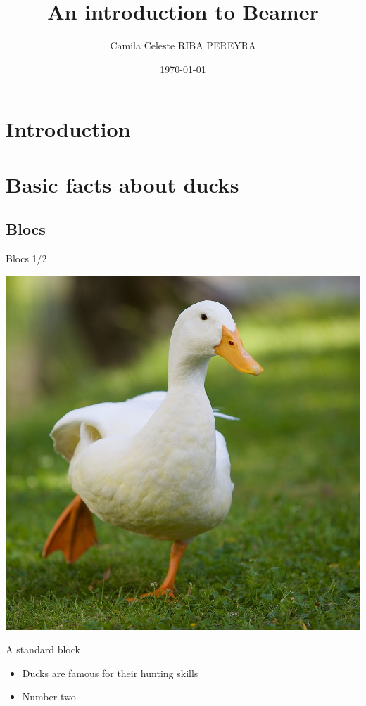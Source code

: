 \documentclass[11pt]{beamer}
\author{Camila Celeste RIBA PEREYRA}
\title{An introduction to Beamer}
\institute{ISTerre - USMB}
\date{\today}
\begin{document}
\section{Introduction}
\begin{frame}[plain]
	\titlepage
\end{frame}

\begin{frame}
\tableofcontents
\end{frame}


\section{Basic facts about ducks}
\subsection{Blocs}
\begin{frame}{Blocs 1/2}
	\begin{center}
		\includegraphics[width = .5\textwidth]{runningduck.jpg}
	\end{center}
	\begin{block} {A standard block}
		\begin{itemize}
			\item Ducks are famous for their hunting skills
			\item Number two
		\end{itemize}
	\end{block}
\end{frame}
\end{document}
